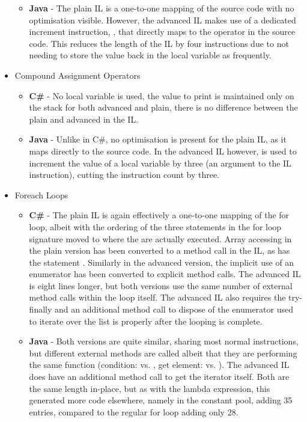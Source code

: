\documentclass{article}
\begin{document}
\begin{itemize}
\begin{itemize}
                \item \textbf{Java} - The plain IL is a one-to-one mapping of the source code with no optimisation visible. However, the advanced IL makes use of a dedicated increment instruction, , that directly maps to the \codeword{++} operator in the source code. This reduces the length of the IL by four instructions due to not needing to store the value back in the local variable as frequently.
            \end{itemize}
            \item Compound Assignment Operators
            \begin{itemize}
                \item \textbf{C\#} - No local variable is used, the value to print is maintained only on the stack for both advanced and plain, there is no difference between the plain and advanced in the IL.
                \item \textbf{Java} - Unlike in C\#, no optimisation is present for the plain IL, as it maps directly to the source code. In the advanced IL however,  is used to increment the value of a local variable by three (an argument to the IL instruction), cutting the instruction count by three.
            \end{itemize}
            \item Foreach Loops
            \begin{itemize}
                \item \textbf{C\#} - The plain IL is again effectively a one-to-one mapping of the for loop, albeit with the ordering of the three statements in the for loop signature moved to where the are actually executed. Array accessing in the plain version has been converted to a method call in the IL, as has the statement . Similarly in the advanced version, the implicit use of an enumerator has been converted to explicit method calls. The advanced IL is eight lines longer, but both versions use the same number of external method calls within the loop itself. The advanced IL also requires the try-finally and an additional method call to dispose of the enumerator used to iterate over the list is properly after the looping is complete.
                \item \textbf{Java} - Both versions are quite similar, sharing most normal instructions, but different external methods are called albeit that they are performing the same function (condition:  vs. , get element:  vs. ). The advanced IL does have an additional method call to get the iterator itself. Both are the same length in-place, but as with the lambda expression, this generated more code elsewhere, namely in the constant pool, adding 35 entries, compared to the regular for loop adding only 28.
            \end{itemize}
        \end{itemize}
\newpage
\end{document}
